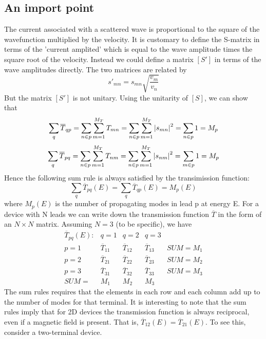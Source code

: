 \documentclass[11pt,a4paper]{book}
\theoremstyle{plain}
\theoremstyle{definition}
\theoremstyle{remark}
\begin{document}
\subsection{An import point}
The current associated with a scattered wave is proportional to the square of the wavefunction multiplied by the velocity. It is customary to define the S-matrix in terms of the 'current amplited' which is equal to the wave amplitude times the square root of the velocity. Instead we could define a matrix $[S']$ in terms of the wave amplitudes directly. The two matrices are related by
\begin{equation}
    s'_{mn} = s_{mn} \sqrt{\frac{v_m}{v_n}}
\end{equation}
But the matrix $[S']$ is not unitary. Using the unitarity of $[S]$, we can show that
\begin{equation}
    \sum_q \overline{T}_{qp} = \sum_{n \in p} \sum_{m=1}^{M_T} T_{mn} = \sum_{n \in p} \sum_{m=1}^{M_T} \abs{s_{mn}}^2 = \sum_{n \in p} 1 = M_p
\end{equation}
\begin{equation}
    \sum_q \overline{T}_{pq} = \sum_{n \in p} \sum_{m=1}^{M_T} T_{nm} = \sum_{n \in p} \sum_{m=1}^{M_T} \abs{s_{nm}}^2 = \sum_{m \in p} 1 = M_p
\end{equation}
Hence the following sum rule is always satisfied by the transimission function:
\begin{equation}
    \sum_q \overline{T}_{pq}(E) = \sum_q \overline{T}_{qp}(E) = M_p(E)
\end{equation}
where $M_p(E)$ is the number of propagating modes in lead p at energy E. For a device with N leads we can write down the transmission function $\overline{T}$ in the form of an $N \times N$ matrix. Assuming $N = 3$ (to be specific), we have
\begin{equation}
    \begin{matrix}
        \overline{T}_{pq}(E): & q=1 & q=2 & q=3 & \\
        p=1 & \overline{T}_{11} & \overline{T}_{12} & \overline{T}_{13} & SUM = M_1 \\
        p=2 & \overline{T}_{21} & \overline{T}_{22} & \overline{T}_{23} & SUM = M_2 \\
        p=3 & \overline{T}_{31} & \overline{T}_{32} & \overline{T}_{33} & SUM = M_3 \\
        SUM= & M_1 & M_2 & M_3 &
    \end{matrix}
\end{equation}
The sum rules requires that the elements in each row and each column add up to the number of modes for that terminal. It is interesting to note that the sum rules imply that for 2D devices the transmission function is always reciprocal, even if a magnetic field is present. That is, $\overline{T}_{12}(E) = \overline{T}_{21}(E)$. To see this, consider a two-terminal device.
\end{document}
